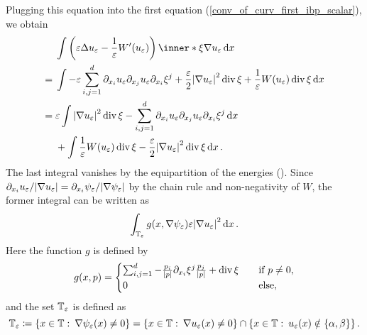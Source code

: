 Plugging this equation into the first equation 
(\ref{conv_of_curv_first_ibp_scalar}), we obtain
\begin{align}
	& \int
	\left(
	\varepsilon \Delta u_{ \varepsilon }
	-
	\frac{ 1 }{ \varepsilon }
	W'( u_{ \varepsilon } ) 
	\right)
	\inner*{ \xi }{ \nabla u_{ \varepsilon } }
	\dd{ x }
	\notag
	\\
	\label{curvature_term_equality_which_bounds}
	={} &
	\int
	-\varepsilon \sum_{ i, j = 1}^{ d }
	\partial_{ x_{ i } } u_{ \varepsilon }
	\partial_{ x_{ j } } u_{ \varepsilon }
	\partial_{ x_{ i } } \xi^{ j } 
	+
	\frac{ \varepsilon }{ 2 }
	\abs{ \nabla u_{ \varepsilon } }^{ 2 }
	\divg \xi 
	+
	\frac{ 1 }{ \varepsilon }
	W ( u_{ \varepsilon } ) 
	\divg \xi 
	\dd{ x }
	\\
	= {} &
	\varepsilon
	\int
	\abs{ \nabla u_{ \varepsilon } }^{ 2 }
	\divg \xi 
	-
	\sum_{ i, j = 1 }^{ d }
	\partial_{ x_{ i } } u_{ \varepsilon }
	\partial_{ x_{ j } } u_{ \varepsilon }
	\partial_{ x_{ i } } \xi^{ j }
	\dd{ x }
	\notag
	\\
	& + 
	\int
	\frac{ 1 }{ \varepsilon }
	W ( u_{ \varepsilon } )
	\divg \xi 
	-
	\frac{ \varepsilon }{ 2 }
	\abs{ \nabla u_{ \varepsilon } }^{ 2 }
	\divg \xi
	\dd{ x }
	\notag.
\end{align}
The last integral vanishes by the equipartition of the energies 
().
Since $ \partial_{ x_{ i } } u_{ \varepsilon } / \abs{ \nabla u_{ \varepsilon } 
} = \partial_{ x_{ i } } \psi_{ \varepsilon } / \abs{ \nabla \psi_{ 
\varepsilon  } } $ by the chain rule and non-negativity of $ W $, the former 
integral can be written as
\begin{equation}
	\label{conv_of_curv_scalar_written_as_g}
	\int_{ \operatorname{\mathbb{T}}_{ \varepsilon } }
	g ( x , \nabla \psi_{ \varepsilon } )
	\varepsilon \abs{ \nabla u_{ \varepsilon } }^{ 2 }
	\dd{ x }.
\end{equation}
Here the function $ g $ is defined by
\begin{equation*}
	g ( x, p )
	=
	\begin{cases}
		\sum_{ i, j = 1}^{ d }
		-
		\frac{ p_{ i } }{ \abs{ p } }
		\partial_{ x_{ i } } \xi^{ j }
		\frac{ p_{ j } }{ \abs{ p } }
		+
		\operatorname{div} \xi 
		\quad
		&\text{if } p \neq 0,
		\\
		0
		&\text{else},
	\end{cases}
\end{equation*}
and the set $ \operatorname{\mathbb{T}}_{ \varepsilon } $ is defined as
\begin{equation*}
	\operatorname{\mathbb{T}}_{ \varepsilon }
	\coloneqq
	\left\{
	x \in \operatorname{\mathbb{T}}
	\, \colon \,
	\nabla \psi_{ \varepsilon } ( x ) \neq 0
	\right\}
	=
	\left\{
	x \in \operatorname{\mathbb{T}}
	\, \colon \,
	\nabla u_{ \varepsilon } ( x ) \neq 0 
	\right\}
	\cap
	\left\{
	x \in \operatorname{\mathbb{T}}
	\, \colon \,
	u_{ \varepsilon } ( x ) \notin \{ \alpha , \beta \}
	\right\}.
\end{equation*}
